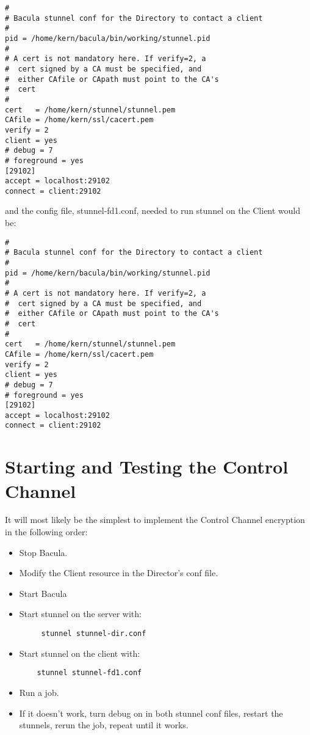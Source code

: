 \footnotesize
\begin{verbatim}
#
# Bacula stunnel conf for the Directory to contact a client
#
pid = /home/kern/bacula/bin/working/stunnel.pid
#
# A cert is not mandatory here. If verify=2, a
#  cert signed by a CA must be specified, and
#  either CAfile or CApath must point to the CA's
#  cert
#
cert   = /home/kern/stunnel/stunnel.pem
CAfile = /home/kern/ssl/cacert.pem
verify = 2
client = yes
# debug = 7
# foreground = yes
[29102]
accept = localhost:29102
connect = client:29102
\end{verbatim}
\normalsize

and the config file, stunnel-fd1.conf, needed to run stunnel on the Client
would be:

\footnotesize
\begin{verbatim}
#
# Bacula stunnel conf for the Directory to contact a client
#
pid = /home/kern/bacula/bin/working/stunnel.pid
#
# A cert is not mandatory here. If verify=2, a
#  cert signed by a CA must be specified, and
#  either CAfile or CApath must point to the CA's
#  cert
#
cert   = /home/kern/stunnel/stunnel.pem
CAfile = /home/kern/ssl/cacert.pem
verify = 2
client = yes
# debug = 7
# foreground = yes
[29102]
accept = localhost:29102
connect = client:29102
\end{verbatim}
\normalsize

\section{Starting and Testing the Control Channel}

It will most likely be the simplest to implement the Control Channel
encryption in the following order:

\begin{itemize}
\item Stop Bacula.
\item Modify the Client resource in the Director's conf  file.
\item Start Bacula
\item Start stunnel on the server with:

   \footnotesize
\begin{verbatim}
     stunnel stunnel-dir.conf

\end{verbatim}
\normalsize

\item Start stunnel on the client with:

   \footnotesize
\begin{verbatim}
    stunnel stunnel-fd1.conf

\end{verbatim}
\normalsize

\item Run a job.
\item If it doesn't work, turn debug on in both stunnel conf files,  restart
   the stunnels, rerun the job, repeat until it works.
   \end{itemize}

